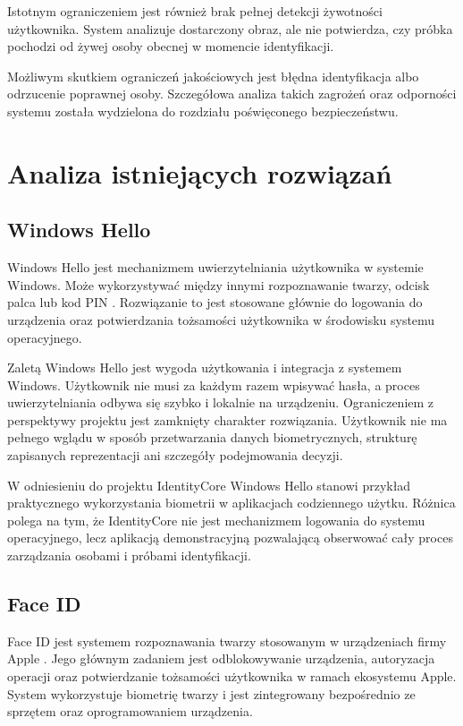 Istotnym ograniczeniem jest również brak pełnej detekcji żywotności użytkownika. System analizuje dostarczony obraz, ale nie potwierdza, czy próbka pochodzi od żywej osoby obecnej w momencie identyfikacji.

Możliwym skutkiem ograniczeń jakościowych jest błędna identyfikacja albo odrzucenie poprawnej osoby. Szczegółowa analiza takich zagrożeń oraz odporności systemu została wydzielona do rozdziału poświęconego bezpieczeństwu.

\section{Analiza istniejących rozwiązań}

\subsection{Windows Hello}

Windows Hello jest mechanizmem uwierzytelniania użytkownika w systemie Windows. Może wykorzystywać między innymi rozpoznawanie twarzy, odcisk palca lub kod PIN \cite{windowshello}. Rozwiązanie to jest stosowane głównie do logowania do urządzenia oraz potwierdzania tożsamości użytkownika w środowisku systemu operacyjnego.

Zaletą Windows Hello jest wygoda użytkowania i integracja z systemem Windows. Użytkownik nie musi za każdym razem wpisywać hasła, a proces uwierzytelniania odbywa się szybko i lokalnie na urządzeniu. Ograniczeniem z perspektywy projektu jest zamknięty charakter rozwiązania. Użytkownik nie ma pełnego wglądu w sposób przetwarzania danych biometrycznych, strukturę zapisanych reprezentacji ani szczegóły podejmowania decyzji.

W odniesieniu do projektu IdentityCore Windows Hello stanowi przykład praktycznego wykorzystania biometrii w aplikacjach codziennego użytku. Różnica polega na tym, że IdentityCore nie jest mechanizmem logowania do systemu operacyjnego, lecz aplikacją demonstracyjną pozwalającą obserwować cały proces zarządzania osobami i próbami identyfikacji.

\newpage

\subsection{Face ID}

Face ID jest systemem rozpoznawania twarzy stosowanym w urządzeniach firmy Apple \cite{faceid}. Jego głównym zadaniem jest odblokowywanie urządzenia, autoryzacja operacji oraz potwierdzanie tożsamości użytkownika w ramach ekosystemu Apple. System wykorzystuje biometrię twarzy i jest zintegrowany bezpośrednio ze sprzętem oraz oprogramowaniem urządzenia.

